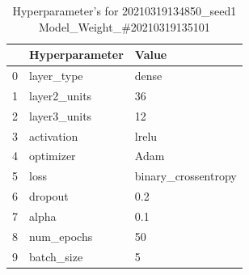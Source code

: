 \begin{table}
\centering
\caption{Hyperparameter's for 20210319134850\_seed1 Model\_Weight\_\#20210319135101}
\label{tab:hyp20210319134850seed1ModelWeight20210319135101}
\begin{tabular}{lll}
\toprule
{} & Hyperparameter &                Value \\
\midrule
0 &     layer\_type &                dense \\
1 &   layer2\_units &                   36 \\
2 &   layer3\_units &                   12 \\
3 &     activation &                lrelu \\
4 &      optimizer &                 Adam \\
5 &           loss &  binary\_crossentropy \\
6 &        dropout &                  0.2 \\
7 &          alpha &                  0.1 \\
8 &     num\_epochs &                   50 \\
9 &     batch\_size &                    5 \\
\bottomrule
\end{tabular}
\end{table}
